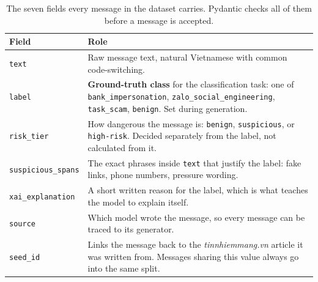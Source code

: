 \begin{table}[H]
\centering
\renewcommand{\arraystretch}{1.3}
\begin{tabular}{L{3.3cm}L{8.7cm}}
\toprule
\textbf{Field} & \textbf{Role} \\
\midrule
\texttt{text}              & Raw message text, natural Vietnamese with common code-switching. \\
\texttt{label}             & \textbf{Ground-truth class} for the classification task: one of \texttt{bank\_impersonation}, \texttt{zalo\_social\_engineering}, \texttt{task\_scam}, \texttt{benign}. Set during generation. \\
\texttt{risk\_tier}        & How dangerous the message is: \texttt{benign}, \texttt{suspicious}, or \texttt{high-risk}. Decided separately from the label, not calculated from it. \\
\texttt{suspicious\_spans} & The exact phrases inside \texttt{text} that justify the label: fake links, phone numbers, pressure wording. \\
\texttt{xai\_explanation}  & A short written reason for the label, which is what teaches the model to explain itself. \\
\texttt{source}            & Which model wrote the message, so every message can be traced to its generator. \\
\texttt{seed\_id}          & Links the message back to the \textit{tinnhiemmang.vn} article it was written from. Messages sharing this value always go into the same split. \\
\bottomrule
\end{tabular}
\caption{The seven fields every message in the dataset carries. Pydantic checks all of them before a message is accepted.}
\label{tab:record-schema}
\end{table}
